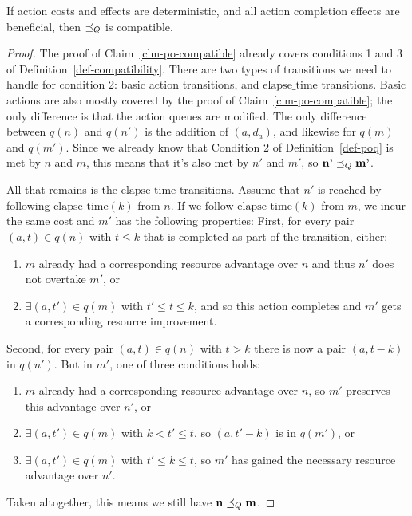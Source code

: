 \documentclass[letterpaper]{article}
\theoremstyle{plain} \newtheorem{theorem}{Theorem} \newtheorem{proposition}{Proposition} \newtheorem{lemma}{Lemma}
\theoremstyle{definition} \newtheorem{definition}{Definition} \newtheorem{conjecture}{Conjecture} \newtheorem*{example}{Example}
\theoremstyle{remark} \newtheorem*{remark}{Remark} \newtheorem*{note}{Note} \newtheorem{case}{Case}
\begin{document}
\begin{claim}{}{\label{clm-poq-compatible}}
	If action costs and effects are deterministic, and all action completion effects are beneficial, then $\preceq_Q$ is compatible.
\end{claim}
\begin{proof}

	The proof of Claim~\ref{clm-po-compatible} already covers conditions 1 and 3 of
Definition~\ref{def-compatibility}. There are two types of transitions we need to handle
for condition 2: basic action transitions, and $\mathrm{elapse\_time}$ transitions. Basic
actions are also mostly covered by the proof of Claim~\ref{clm-po-compatible}; the only
difference is that the action queues are modified. The only difference between $q(n)$ and
$q(n')$ is the addition of $(a, d_a)$, and likewise for $q(m)$ and $q(m')$. Since we
already know that Condition 2 of Definition~\ref{def-poq} is met by $n$ and $m$, this
means that it's also met by $n'$ and $m'$, so $\textbf{n'} \preceq_Q \textbf{m'}$.

	All that remains is the $\mathrm{elapse\_time}$ transitions. Assume that $n'$ is
reached by following $\mathrm{elapse\_time}(k)$ from $n$. If we follow $\mathrm{elapse\_time}(k)$ from $m$, we incur the same cost and $m'$ has the following properties: First, for every pair $(a, t) \in q(n)$ with $t \le k$ that is completed as part of the transition, either:
\begin{enumerate}
	\item $m$ already had a corresponding resource advantage over $n$ and thus $n'$ does not overtake $m'$, or
	\item $\exists (a, t') \in q(m)$ with $t' \le t \le k$, and so this action completes and $m'$ gets a corresponding resource improvement.
\end{enumerate}
Second, for every pair $(a, t) \in q(n)$ with $t > k$ there is now a pair $(a, t-k)$ in $q(n')$. But in $m'$, one of three conditions holds:
\begin{enumerate}
	\item $m$ already had a corresponding resource advantage over $n$, so $m'$ preserves this advantage over $n'$, or
	\item $\exists (a, t') \in q(m)$ with $k < t' \le t$, so $(a, t'-k)$ is in $q(m')$, or
	\item $\exists (a, t') \in q(m)$ with $t' \le k \le t$, so $m'$ has gained the necessary resource advantage over $n'$.
\end{enumerate}
Taken altogether, this means we still have $\textbf{n} \preceq_Q \textbf{m}$.

\end{proof}
\end{document}

